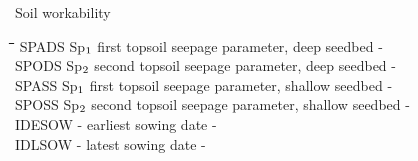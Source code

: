 \documentclass[11pt]{article}
\begin{document}
\bigskip
Soil workability\nwln
\begin{tabbing}
\hspace{1.27cm}\=\hspace{1.27cm}\=\hspace{1.27cm}\=\hspace{1.27cm}\=%
\hspace{1.27cm}\=\hspace{1.27cm}\=\hspace{1.27cm}\=\hspace{1.27cm}\=%
\hspace{1.27cm}\=\hspace{1.27cm}\=\kill
SPADS\> \> Sp$_{{\rm 1}}$\> first topsoil seepage parameter, deep seedbed\> \> \> \> \> \> \> -\\
SPODS\> \> Sp$_{{\rm 2}}$\> second topsoil seepage parameter, deep seedbed\> \> \> \> \> \> \> -\\
SPASS\> \> Sp$_{{\rm 1}}$\> first topsoil seepage parameter, shallow seedbed\> \> \> \> \> \> \> -\\
SPOSS\> \> Sp$_{{\rm 2}}$\> second topsoil seepage parameter, shallow seedbed\> \> \> \> \> \> \> -\\
IDESOW\> \> -\> earliest sowing date\> \> \> \> \> \> \> -\\
IDLSOW\> \> -\> latest sowing date\> \> \> \> \> \> \> -
\end{tabbing}
\end{document}
